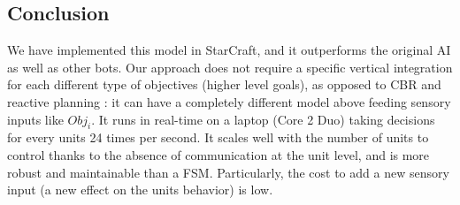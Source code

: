 
\subsection{Conclusion}
\label{BayesianUnitCCL}
We have implemented this model in StarCraft, and it outperforms the original AI as well as other bots. Our approach does not require a specific vertical integration for each different type of objectives (higher level goals), as opposed to CBR and reactive planning \citep{Ontanon2007,WeberCIG10}: it can have a completely different model above feeding sensory inputs like $Obj_i$. It runs in real-time on a laptop (Core 2 Duo) taking decisions for every units 24 times per second. It scales well with the number of units to control thanks to the absence of communication at the unit level, and is more robust and maintainable than a FSM. Particularly, the cost to add a new sensory input (a new effect on the units behavior) is low.

